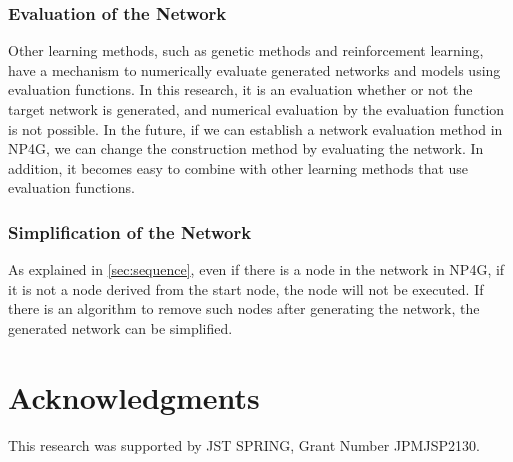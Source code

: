 \documentclass{article}
\begin{document}
\subsubsection {Evaluation of the Network}
Other learning methods, such as genetic methods and reinforcement learning, have a mechanism to numerically evaluate generated networks and models using evaluation functions.
In this research, it is an evaluation whether or not the target network is generated, and numerical evaluation by the evaluation function is not possible.
In the future, if we can establish a network evaluation method in NP4G, we can change the construction method by evaluating the network.
In addition, it becomes easy to combine with other learning methods that use evaluation functions.

\subsubsection {Simplification of the Network}
As explained in \ref{sec:sequence}, even if there is a node in the network in NP4G, if it is not a node derived from the start node, the node will not be executed.
If there is an algorithm to remove such nodes after generating the network, the generated network can be simplified.

\section*{Acknowledgments}
This research was supported by JST SPRING, Grant Number JPMJSP2130.


  
  
\end{document}
